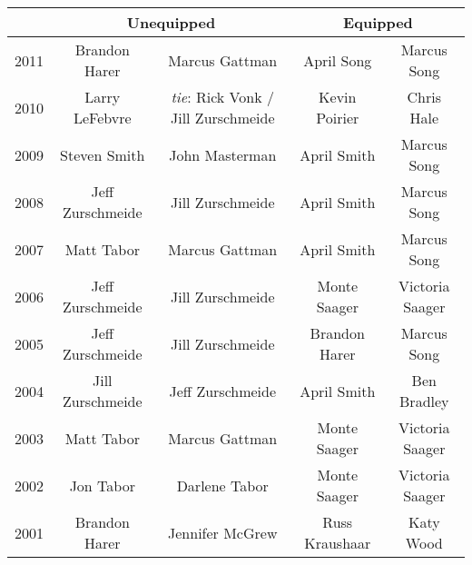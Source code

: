 \begin{tabular}{ |c|c|c|c|c| }
  \hline
  \multicolumn{1}{|c|}{} &
  \multicolumn{2}{|c|}{Unequipped} &
  \multicolumn{2}{|c|}{Equipped} \\
  \hline
  2011 & Brandon Harer & Marcus Gattman & April Song & Marcus Song \\
  2010 & Larry LeFebvre & \textit{tie}: Rick Vonk / \linebreak Jill Zurschmeide & Kevin Poirier & Chris Hale \\
  2009 & Steven Smith & John Masterman & April Smith & Marcus Song \\
  2008 & Jeff Zurschmeide & Jill Zurschmeide & April Smith & Marcus Song \\
  2007 & Matt Tabor & Marcus Gattman & April Smith & Marcus Song \\
  2006 & Jeff Zurschmeide & Jill Zurschmeide & Monte Saager & Victoria Saager \\
  2005 & Jeff Zurschmeide & Jill Zurschmeide & Brandon Harer & Marcus Song \\
  2004 & Jill Zurschmeide & Jeff Zurschmeide & April Smith & Ben Bradley \\
  2003 & Matt Tabor & Marcus Gattman & Monte Saager & Victoria Saager \\
  2002 & Jon Tabor & Darlene Tabor & Monte Saager & Victoria Saager \\
  2001 & Brandon Harer & Jennifer McGrew & Russ Kraushaar & Katy Wood \\
  \hline
\end{tabular}